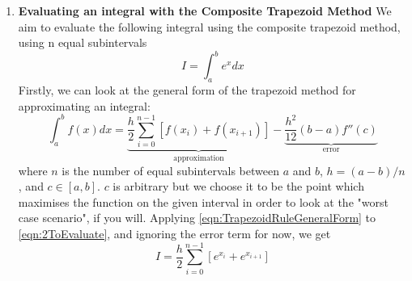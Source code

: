 \documentclass[12pt]{article}
\begin{document}
\begin{enumerate}
        \item \textbf{Evaluating an integral with the Composite Trapezoid Method} \newline
        We aim to evaluate the following integral using the composite trapezoid method, using n 
        equal subintervals
        \begin{equation}
            I = \int_a^b e^xdx
            \label{eqn:2ToEvaluate}
        \end{equation}
        Firstly, we can look at the general form of the trapezoid method for approximating an 
        integral:
        \begin{equation}
            \int_a^b f(x)dx = \underbrace{\frac{h}{2}\sum_{i=0}^{n-1}[f(x_i)+f(x_{i+1})]}_\text{approximation}
            -\underbrace{\frac{h^2}{12}(b-a)f''(c)}_\text{error}
            \label{eqn:TrapezoidRuleGeneralForm}
        \end{equation}
        where $n$ is the number of equal subintervals between $a$ and $b$, $h=(a-b)/n$, and $c\in[a,b]$.
        $c$ is arbitrary but we choose it to be the point which maximises the function on the given 
        interval in order to look at the "worst case scenario", if you will. Applying \autoref{eqn:TrapezoidRuleGeneralForm} 
        to \autoref{eqn:2ToEvaluate}, and ignoring the error term for now, we get 
        \begin{equation*}
            I = \frac{h}{2}\sum_{i=0}^{n-1}[e^{x_i}+e^{x_{i+1}}]
        \end{equation*}
    \end{enumerate}
\end{document}
